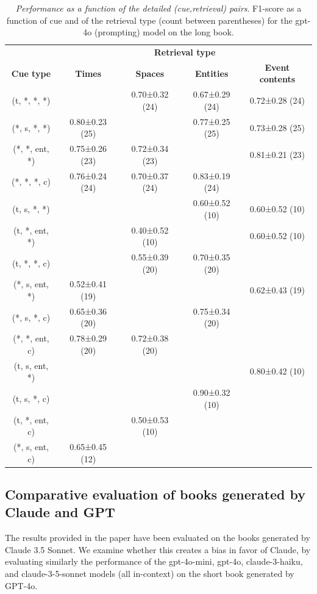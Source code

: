 \documentclass{article}
\begin{document}
\begin{table}[t]
\centering
\caption{\textit{Performance as a function of the detailed (cue,retrieval) pairs}.  F1-score as a function of cue and of the retrieval type (count between parentheses) for the gpt-4o (prompting) model on the long book.}
\label{tab:result_cue_retrieval}
\begin{tabular}{@{}ccccc@{}}
\toprule
 & \multicolumn{4}{c}{\bf Retrieval type} \\
\textbf{Cue type} & \textbf{Times} & \textbf{Spaces} & \textbf{Entities} & \textbf{Event contents} \\ \midrule
(t, *, *, *) &   & 0.70±0.32 (24) & 0.67±0.29 (24) & 0.72±0.28 (24)  \\
(*, s, *, *) & 0.80±0.23 (25) &   & 0.77±0.25 (25) & 0.73±0.28 (25)\\
(*, *, ent, *) & 0.75±0.26 (23) & 0.72±0.34 (23) &   & 0.81±0.21 (23) \\
(*, *, *, c) & 0.76±0.24 (24) & 0.70±0.37 (24) & 0.83±0.19 (24) &  \\
(t, s, *, *) &   &   & 0.60±0.52 (10) & 0.60±0.52 (10) \\
(t, *, ent, *) &   & 0.40±0.52 (10) &   & 0.60±0.52 (10) \\
(t, *, *, c) &   & 0.55±0.39 (20) & 0.70±0.35 (20) & \\
(*, s, ent, *) & 0.52±0.41 (19) &   &   & 0.62±0.43 (19)  \\
(*, s, *, c) & 0.65±0.36 (20) &   & 0.75±0.34 (20) &   \\
(*, *, ent, c) & 0.78±0.29 (20) & 0.72±0.38 (20) &   & \\
(t, s, ent, *) &   &   &   & 0.80±0.42 (10) \\
(t, s, *, c) &   &   & 0.90±0.32 (10) &  \\
(t, *, ent, c) &   & 0.50±0.53 (10) &   &  \\
(*, s, ent, c) & 0.65±0.45 (12) &   &   &  \\ \bottomrule
\end{tabular}
\end{table}



\subsection{Comparative evaluation of books generated by Claude and GPT}\label{app:ablation_gpt_vs_claude_books}

The results provided in the paper have been evaluated on the books generated by Claude 3.5 Sonnet. We examine whether this creates a bias in favor of Claude, by evaluating similarly the performance of the gpt-4o-mini, gpt-4o, claude-3-haiku, and claude-3-5-sonnet models (all in-context) on the short book generated by GPT-4o.
\end{document}
